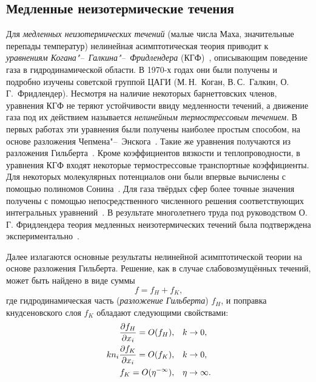 \subsection{Медленные неизотермические течения}

Для \emph{медленных неизотермических течений} (малые числа Маха, значительные перепады температур)
нелинейная асимптотическая теория приводит к \emph{уравнениям Когана"--~Галкина"--~Фридлендера} (КГФ)~\cite{Kogan1976},
описывающим поведение газа в гидродинамической области.
В 1970-х годах они были получены и подробно изучены советской группой ЦАГИ
(М.\,Н.~Коган, В.\,С.~Галкин, О.\,Г.~Фридлендер).
Несмотря на наличие некоторых барнеттовских членов,
уравнения КГФ не теряют устойчивости ввиду медленности течений,
а движение газа под их действием называется \emph{нелинейным термострессовым течением}.
В первых работах эти уравнения были получены наиболее простым способом,
на основе разложения Чепмена"--~Энскога~\cite{Kogan1970, Kogan1971}.
Такие же уравнения получаются из разложения Гильберта~\cite{Galkin1974}.
Кроме коэффициентов вязкости и теплопроводности, в уравнения КГФ входят некоторые
термострессовые транспортные коэффициенты. Для некоторых молекулярных потенциалов они
были впервые вычислены с помощью полиномов Сонина~\cite{Burnett1935, Chapman1960}.
Для газа твёрдых сфер более точные значения получены с помощью
непосредственного численного решения соответствующих интегральных уравнений~\cite{Sone1996}.
В результате многолетнего труда под руководством О.\,Г. Фридлендера теория медленных неизотермических течений
была подтверждена экспериментально~\cite{Friedlander1997, Friedlander2003}.

Далее излагаются основные результаты нелинейной асимптотической теории на основе разложения Гильберта.
Решение, как в случае слабовозмущённых течений, может быть найдено в виде суммы
\begin{equation}\label{eq:sum_solutions}
    f = f_H + f_K,
\end{equation}
где гидродинамическая часть (\emph{разложение Гильберта}) \(f_H\),
и поправка кнудсеновского слоя \(f_K\) обладают следующими свойствами:
\begin{align}
    \pder[f_H]{x_i} = \OO{f_H}, &\quad k\to0, \label{eq:Hilbert_assumption}\\
    k n_i\pder[f_K]{x_i} = \OO{f_K}, &\quad k\to0, \label{eq:Knudsen_assumption}\\
    f_K = \OO{\eta^{-\infty}}, &\quad \eta\to\infty. \label{eq:Knudsen_decay}
\end{align}

